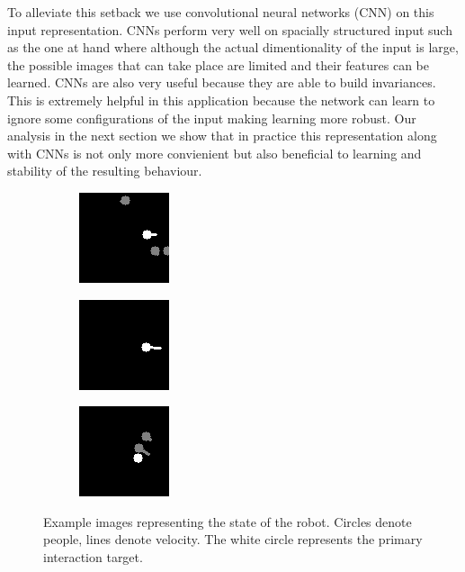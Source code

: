 \documentclass[letterpaper, 10 pt, conference]{ieeeconf}
\begin{document}
To alleviate this setback we use convolutional neural networks (CNN) on this input representation. CNNs perform very well on spacially structured input such as the one at hand where although the actual dimentionality of the input is large, the possible images that can take place are limited and their features can be learned. CNNs are also very useful because they are able to build invariances. This is extremely helpful in this application because the network can learn to ignore some configurations of the input making learning more robust. Our analysis in the next section we show that in practice this representation along with CNNs is not only more convienient but also beneficial to learning and stability of the resulting behaviour.

  	\begin{figure}[tbh]
  	\centering
      \begin{subfigure}[b]{0.30\columnwidth}
    \includegraphics[scale = 0.80]{images/state1.png}
    \label{fig:state1}
  \end{subfigure}
  \begin{subfigure}[b]{0.30\columnwidth}
    \includegraphics[scale = 0.80]{images/state2.png}
       \label{fig:state2}
  \end{subfigure} 
    \begin{subfigure}[b]{0.30\columnwidth}
    \includegraphics[scale = 0.80]{images/state3.png}
       \label{fig:state3}
  \end{subfigure}
  \caption{Example images representing the state of the robot. Circles denote people, lines denote velocity. The white circle represents the primary interaction target.}

    \vspace{-2mm}
  \label{fig:state}
  \end{figure}
\end{document}
